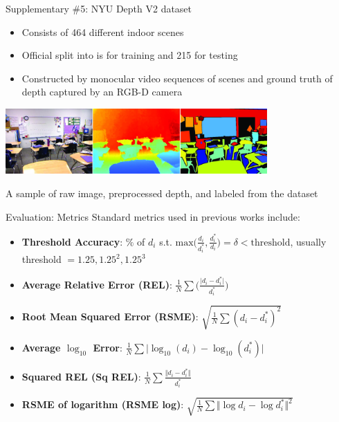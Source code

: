 \documentclass[10pt]{beamer}
\begin{document}
\begin{frame}{Supplementary \#5: NYU Depth V2 dataset}
\begin{itemize}
    \item Consists of 464 different indoor scenes
    \item Official split into is for training and 215 for testing
    \item Constructed by monocular video sequences of scenes and ground truth of depth captured by an RGB-D camera
\end{itemize}

\smallskip
\centering
\includegraphics[width=10cm]{nyu_sample.jpg}\par
A sample of raw image, preprocessed depth, and labeled from the dataset

\end{frame}

\begin{frame}{Evaluation: Metrics}
    Standard metrics used in previous works include:
    \begin{itemize}
        \item \textbf{Threshold Accuracy}: $\%$ of $d_i$ s.t. $\text{max}\Big(\frac{d_i}{d_i^{*}},\frac{d_i^{*}}{d_i}\Big)=\delta<\text{threshold}$, usually threshold $=1.25,1.25^2,1.25^3$
        \item \textbf{Average Relative Error (REL)}: $\frac{1}{N}\sum\Big(\frac{\lvert d_i-d_i^{*}\rvert}{d_i^{*}}\Big)$
        \item \textbf{Root Mean Squared Error (RSME)}: $\sqrt{\frac{1}{N}\sum( d_i-d_i^{*})^{2}}$
        \item \textbf{Average $\log_{10}$ Error}: $\frac{1}{N}\sum\lvert \log_{10}(d_i)-\log_{10}(d_i^{*}) \rvert$
        \item \textbf{Squared REL (Sq REL)}: $\frac{1}{N}\sum\frac{\Vert d_i-d_i^{*}\Vert}{d_i^{*}}$
        \item \textbf{RSME of logarithm (RSME log)}: $\sqrt{\frac{1}{N}\sum\Vert \log d_i-\log d_i^{*}\Vert^{2}}$
    \end{itemize}
    
    \vspace{0.3cm}
    
    
\end{frame}
\end{document}
